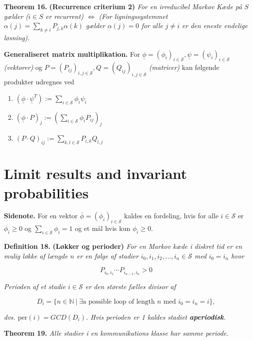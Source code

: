 \documentclass[a4paper,12pt,openany]{book}
\providecommand{\tightlist}{%
 \setlength{\itemsep}{0pt}\setlength{\parskip}{0pt}}
\begin{document}
\textbf{Theorem 16.} \textbf{(Recurrence criterium 2)} \emph{For en irreducibel Markov Kæde på \(S\) gælder (\(i\in S\) er recurrent) \(\Leftrightarrow\) (For ligningssystemmet \(\alpha(j)=\sum_{k\ne i}P_{j,k}\alpha(k)\) gælder \(\alpha(j)=0\) for alle \(j\ne i\) er den eneste endelige løsning).}

\textbf{Generaliseret matrix multiplikation.} For \(\underline{\phi}=(\phi_i)_{i\in\mathcal{S}},\underline{\psi}=(\psi_i)_{i\in\mathcal{S}}\) \emph{(vektorer)} og \(P=(P_{ij})_{i,j\in\mathcal{S}},Q=(Q_{ij})_{i,j\in\mathcal{S}}\) \emph{(matricer)} kan følgende produkter udregnes ved

\begin{enumerate}
\def\labelenumi{\roman{enumi}.}
\tightlist
\item
  \((\underline{\phi}\cdot \underline{\psi}^T):=\sum_{i\in\mathcal{S}}\phi_i\psi_i\)
\item
  \((\underline{\phi}\cdot P)_j:=\left(\sum_{i\in\mathcal{S}}\phi_i P_{ij}\right)_j\)
\item
  \((P\cdot Q)_{ij}:=\sum_{k,l\in\mathcal{S}}P_{i,k}Q_{l,j}\)
\end{enumerate}

\hypertarget{limit-results-and-invariant-probabilities}{%
\section{Limit results and invariant probabilities}\label{limit-results-and-invariant-probabilities}}

\textbf{Sidenote.} For en vektor \(\overline{\phi}=(\phi_i)_{i\in \mathcal{S}}\) kaldes en fordeling, hvis for alle \(i\in\mathcal{S}\) er \(\phi_i\ge0\) og \(\sum_{i\in\mathcal{S}}\phi_i=1\) og et mål hvis kun \(\phi_i\ge 0\).

\textbf{Definition 18.} \textbf{(Løkker og perioder)} \emph{For en Markov kæde i diskret tid er en mulig løkke af længde \(n\) er en følge af stadier \(i_0,i_1,i_2,...,i_n\in\mathcal{S}\) med \(i_0=i_n\) hvor}

\[
P_{i_0,i_1}\cdots P_{i_{n-1},i_n}>0
\]

\emph{Perioden af et stadie \(i\in\mathcal{S}\) er den største fælles divisor af}

\[
D_i=\{n\in\mathbb{N}\ \vert\ \exists \text{a possible loop of length $n$ med $i_0=i_n=i$}\},
\]

\emph{dvs. \(\text{per}(i)=GCD(D_i)\). Hvis perioden er 1 kaldes stadiet \textbf{aperiodisk}.}

\textbf{Theorem 19.} \emph{Alle stadier i en kommunikations klasse har samme periode.}
\end{document}
